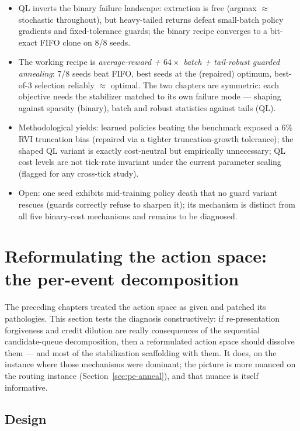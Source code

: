 \documentclass[11pt,a4paper]{article}
\begin{document}
\begin{itemize}
  \item QL inverts the binary failure landscape: extraction is free
  (argmax $\approx$ stochastic throughout), but heavy-tailed returns
  defeat small-batch policy gradients and fixed-tolerance guards; the
  binary recipe converges to a bit-exact FIFO clone on 8/8 seeds.
  \item The working recipe is \emph{average-reward + $64\times$ batch +
  tail-robust guarded annealing}: 7/8 seeds beat FIFO, best seeds at the
  (repaired) optimum, best-of-3 selection reliably $\approx$ optimal.
  The two chapters are symmetric: each objective needs the stabilizer
  matched to its own failure mode --- shaping against sparsity (binary),
  batch and robust statistics against tails (QL).
  \item Methodological yields: learned policies beating the benchmark
  exposed a 6\% RVI truncation bias (repaired via a tighter
  truncation-growth tolerance); the shaped QL variant is exactly
  cost-neutral but empirically unnecessary; QL cost levels are not
  tick-rate invariant under the current parameter scaling (flagged for
  any cross-tick study).
  \item Open: one seed exhibits mid-training policy death that no guard
  variant rescues (guards correctly refuse to sharpen it); its mechanism
  is distinct from all five binary-cost mechanisms and remains to be
  diagnosed.
\end{itemize}

\section{Reformulating the action space: the per-event decomposition}
\label{sec:pe}

The preceding chapters treated the action space as given and patched its
pathologies.  This section tests the diagnosis constructively: if
re-presentation forgiveness and credit dilution are really consequences
of the sequential candidate-queue decomposition, then a reformulated
action space should dissolve them --- and most of the stabilization
scaffolding with them.  It does, on the instance where those mechanisms
were dominant; the picture is more nuanced on the routing instance
(Section~\ref{sec:pe-anneal}), and that nuance is itself informative.

\subsection{Design}
\end{document}

